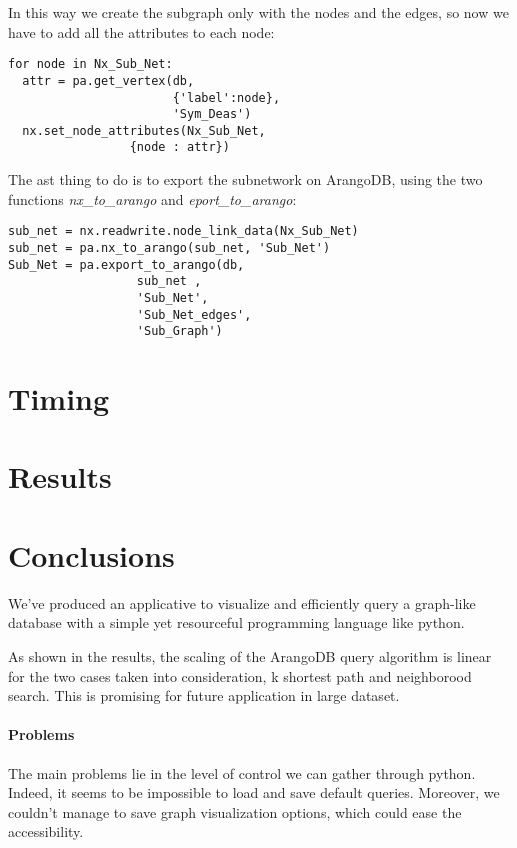 \documentclass[11pt,twocolumn]{article}
\begin{document}
In this way we create the subgraph only with the nodes and the edges, so now we have to add all the attributes to each node:

\begin{verbatim}
for node in Nx_Sub_Net:
  attr = pa.get_vertex(db, 
                       {'label':node}, 
                       'Sym_Deas')
  nx.set_node_attributes(Nx_Sub_Net, 
                 {node : attr})
\end{verbatim}
The ast thing to do is to export the subnetwork on ArangoDB, using the two functions \textit{nx\_to\_arango} and \textit{eport\_to\_arango}:

\begin{verbatim}
sub_net = nx.readwrite.node_link_data(Nx_Sub_Net)
sub_net = pa.nx_to_arango(sub_net, 'Sub_Net')
Sub_Net = pa.export_to_arango(db, 
                  sub_net ,
                  'Sub_Net', 
                  'Sub_Net_edges', 
                  'Sub_Graph')
\end{verbatim}

\section{Timing}

\section{Results}

\section{Conclusions}

We've produced an applicative to visualize and efficiently query a graph-like database with a simple yet resourceful programming language like python.

As shown in the results, the scaling of the ArangoDB query algorithm is linear for the two cases taken into consideration, k shortest path and neighborood search. This is promising for future application in large dataset.

\paragraph{Problems}

The main problems lie in the level of control we can gather through python. Indeed, it seems to be impossible to load and save default queries.
Moreover, we couldn't manage to save graph visualization options, which could ease the accessibility.
\end{document}
